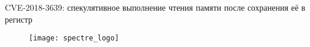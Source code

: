 \begin{frame}{\insertsubsection}

  CVE-2018-3639: спекулятивное выполнение чтения памяти после сохранения её в
  регистр

  \begin{figure}[h]
    \texttt{[image: spectre\_logo]}
  \end{figure}

  \note{


  }
\end{frame}







